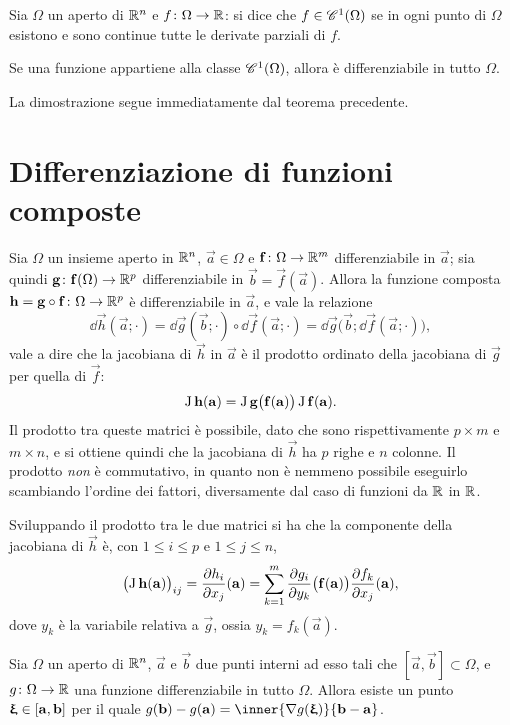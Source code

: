 \begin{definizione}
Sia $\Omega$ un aperto di $\R^n$ e $f\colon\Omega\to\R$: si dice che $f\in\cont[1]{\Omega}$ se in ogni punto di $\Omega$ esistono e sono continue tutte le derivate parziali di $f$.
\end{definizione}
\begin{corollario}
Se una funzione appartiene alla classe $\cont[1]{\Omega}$, allora è differenziabile in tutto $\Omega$.
\end{corollario}
La dimostrazione segue immediatamente dal teorema precedente.

\section{Differenziazione di funzioni composte}
\begin{teorema}
	Sia $\Omega$ un insieme aperto in $\R^n$, $\vec a\in\Omega$ e $\vec f\colon\Omega\to\R^m$ differenziabile in $\vec a$; sia quindi $\vec g\colon\vec f(\Omega)\to\R^p$ differenziabile in $\vec b=\vec f(\vec a)$.
	Allora la funzione composta $\vec h=\vec g\circ\vec f\colon\Omega\to\R^p$ è differenziabile in $\vec a$, e vale la relazione
	\begin{equation} \label{eq:composizione_differenziali}
		\dd\vec h(\vec a;\cdot)=\dd\vec g(\vec b;\cdot)\circ\dd\vec f(\vec a;\cdot)=\dd\vec g\big(\vec b;\dd\vec f(\vec a;\cdot)\big),
	\end{equation}
	vale a dire che la jacobiana di $\vec h$ in $\vec a$ è il prodotto ordinato della jacobiana di $\vec g$ per quella di $\vec f$:
	\begin{equation}
		\jac\vec h(\vec a)=\jac\vec g\big(\vec f(\vec a)\big)\jac\vec f(\vec a).
	\end{equation}
	Il prodotto tra queste matrici è possibile, dato che sono rispettivamente $p\times m$ e $m\times n$, e si ottiene quindi che la jacobiana di $\vec h$ ha $p$ righe e $n$ colonne. Il prodotto \emph{non} è commutativo, in quanto non è nemmeno possibile eseguirlo scambiando l'ordine dei fattori, diversamente dal caso di funzioni da $\R$ in $\R$.
\end{teorema}
Sviluppando il prodotto tra le due matrici si ha che la componente della jacobiana di $\vec h$ è, con $1\leq i\leq p$ e $1\leq j\leq n$,
\[
\big(\!\jac\vec h(\vec a)\big)_{ij}=\drp{h_i}{x_j}(\vec a)=\sum_{k=1}^m\drp{g_i}{y_k}\big(\vec f(\vec a)\big)\drp{f_k}{x_j}(\vec a),
\]
dove $y_k$ è la variabile relativa a $\vec g$, ossia $y_k=f_k(\vec a)$.
\begin{teorema}[di Lagrange] \label{t:lagrange_piu_variabili}
Sia $\Omega$ un aperto di $\R^n$, $\vec a$ e $\vec b$ due punti interni ad esso tali che $[\vec a,\vec b]\subset\Omega$, e $g\colon\Omega\to\R$ una funzione differenziabile in tutto $\Omega$. Allora esiste un punto $\vxi\in[\vec a,\vec b]$ per il quale $g(\vec b)-g(\vec a)=\inner{\grad g(\vxi)}{\vec b-\vec a}$.
\end{teorema}
